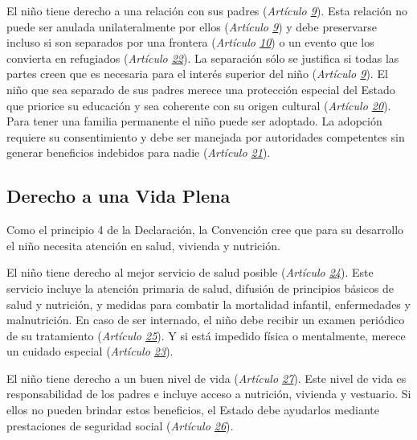 \documentclass{tufte-handout}
\begin{document}
El niño tiene derecho a una relación con sus padres (\textit{Artículo \href{https://procosi.github.io/nenes/convencion/?a=9}{9}}). Esta relación no puede ser anulada unilateralmente por ellos (\textit{Artículo \href{https://procosi.github.io/nenes/convencion/?a=9}{9}}) y debe preservarse incluso si son separados por una frontera (\textit{Artículo \href{https://procosi.github.io/nenes/convencion/?a=10}{10}}) o un evento que los convierta en refugiados (\textit{Artículo \href{https://procosi.github.io/nenes/convencion/?a=22}{22}}). La separación sólo se justifica si todas las partes creen que es necesaria para el interés superior del niño (\textit{Artículo \href{https://procosi.github.io/nenes/convencion/?a=9}{9}}). El niño que sea separado de sus padres merece una protección especial del Estado que priorice su educación y sea coherente con su origen cultural (\textit{Artículo \href{https://procosi.github.io/nenes/convencion/?a=}{20}}). Para tener una familia permanente el niño puede ser adoptado. La adopción requiere su consentimiento y debe ser manejada por autoridades competentes sin generar beneficios indebidos para nadie (\textit{Artículo \href{https://procosi.github.io/nenes/convencion/?a=21}{21}}).

\subsection{Derecho a una Vida Plena}\label{subsec:vida_plena}


Como el principio 4 de la Declaración, la Convención cree que para su desarrollo el niño necesita atención en salud, vivienda y nutrición.

El niño tiene derecho al mejor servicio de salud posible (\textit{Artículo \href{https://procosi.github.io/nenes/convencion/?a=24}{24}}). Este servicio incluye la atención primaria de salud, difusión de principios básicos de salud y nutrición, y medidas para combatir la mortalidad infantil, enfermedades y malnutrición. En caso de ser internado, el niño debe recibir un examen periódico de su tratamiento (\textit{Artículo \href{https://procosi.github.io/nenes/convencion/?a=25}{25}}). Y si está impedido física o mentalmente, merece un cuidado especial (\textit{Artículo \href{https://procosi.github.io/nenes/convencion/?a=23}{23}}).

El niño tiene derecho a un buen nivel de vida (\textit{Artículo \href{https://procosi.github.io/nenes/convencion/?a=27}{27}}). Este nivel de vida es responsabilidad de los padres e incluye acceso a nutrición, vivienda y vestuario. Si ellos no pueden brindar estos beneficios, el Estado debe ayudarlos mediante prestaciones de seguridad social (\textit{Artículo \href{https://procosi.github.io/nenes/convencion/?a=26}{26}}).
\end{document}
